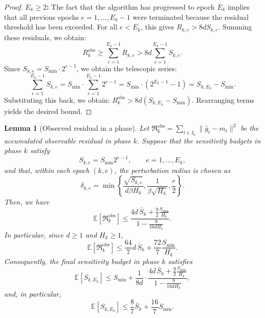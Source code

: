 \documentclass[journal,onecolumn]{IEEEtran}
\theoremstyle{plain}
\newtheorem{lemma}[theorem]{Lemma}
\theoremstyle{definition}
\theoremstyle{remark}
\newcommand{\regret}{\mathfrak{R}}
\begin{document}
{\begin{proof}
    \textbf{$E_{k} \ge 2$:} The fact that the algorithm has progressed to epoch $E_{k}$
    implies that all previous epochs $e=1,\dots,E_{k}-1$ were terminated because
    the residual threshold has been exceeded. For all $e < E_{k}$, this gives $R_{k,e}> 8
    d S_{k,e}$. Summing these residuals, we obtain:
    \begin{equation*}
        R^{\mathrm{obs}}_{k} \ge \sum_{e=1}^{E_k-1}R_{k,e}> 8d \sum_{e=1}^{E_k-1}
        S_{k,e}.
    \end{equation*}
    Since $S_{k,e}= S_{\min}\cdot 2^{e-1}$, we obtain the telescopic series:
    \begin{equation*}
        \sum_{e=1}^{E_k-1}S_{k,e}= S_{\min}\cdot\sum_{e=1}^{E_k-1}2^{e-1}= S_{\min}\cdot(2^{E_k-1}- 1) = S_{k,E_k}
        - S_{\min}.
    \end{equation*}
    Substituting this back, we obtain: $R^{\mathrm{obs}}_{k} > 8d(S_{k,E_k}-S_{\min})$.
    Rearranging terms yields the desired bound.
\end{proof}

\begin{lemma}[Observed residual in a phase]
\label{lem:phase-residual-vs-Sbar}
Let $\regret_k^{\mathrm{obs}}=
\sum_{t\in I_k}\|\hat g_t-m_t\|^2$ be the accumulated observable residual in phase $k$. Suppose that the
sensitivity budgets in phase $k$ satisfy
\begin{equation*}
    S_{k,e}=S_{\min}2^{e-1},\qquad e=1,\ldots,E_k,
\end{equation*}
and that, within each epoch $(k,e)$, the perturbation radius is chosen as
\begin{equation*}
    \delta_{k,e}
    =
    \min\left\{
        \frac{\sqrt{S_{k,e}}}{d\beta H_k},
        \frac{1}{\beta\sqrt{H_k}},
        \frac r2
    \right\}.
\end{equation*}
Then, we have
\begin{equation*}
\mathbb E[\regret_k^{\mathrm{obs}}]
\le
\frac{
    4d\,\bar S_k+\frac{9}{2}\frac{S_{\min}}{H_k}
}{
    1-\frac{9}{16dH_k}
}.
\end{equation*}
In particular, since $d\ge 1$ and $H_k\ge 1$,
\begin{equation*}
\mathbb E[\regret_k^{\mathrm{obs}}]
\le
\frac{64}{7}d\,\bar S_k
+
\frac{72}{7}\frac{S_{\min}}{H_k}.
\end{equation*}
Consequently, the final sensitivity budget in phase $k$ satisfies
\begin{equation*}
\mathbb E[S_{k,E_k}]
\le
S_{\min}
+
\frac{1}{8d}
\cdot
\frac{
    4d\,\bar S_k+\frac{9}{2}\frac{S_{\min}}{H_k}
}{
    1-\frac{9}{16dH_k}
},
\end{equation*}
and, in particular,
\begin{equation*}
\mathbb E[S_{k,E_k}]
\le
\frac{8}{7}\bar S_k
+
\frac{16}{7}S_{\min}.
\end{equation*}
\end{lemma}

}
\end{document}
